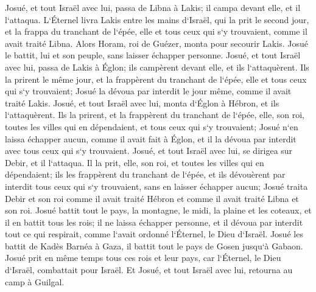 \verse Josué, et tout Israël avec lui, passa de Libna à Lakis; il campa devant elle, et il l`attaqua. 
\verse L`Éternel livra Lakis entre les mains d`Israël, qui la prit le second jour, et la frappa du tranchant de l`épée, elle et tous ceux qui s`y trouvaient, comme il avait traité Libna. 
\verse Alors Horam, roi de Guézer, monta pour secourir Lakis. Josué le battit, lui et son peuple, sans laisser échapper personne. 
\verse Josué, et tout Israël avec lui, passa de Lakis à Églon; ils campèrent devant elle, et ils l`attaquèrent. 
\verse Ils la prirent le même jour, et la frappèrent du tranchant de l`épée, elle et tous ceux qui s`y trouvaient; Josué la dévoua par interdit le jour même, comme il avait traité Lakis. 
\verse Josué, et tout Israël avec lui, monta d`Églon à Hébron, et ils l`attaquèrent. 
\verse Ils la prirent, et la frappèrent du tranchant de l`épée, elle, son roi, toutes les villes qui en dépendaient, et tous ceux qui s`y trouvaient; Josué n`en laissa échapper aucun, comme il avait fait à Églon, et il la dévoua par interdit avec tous ceux qui s`y trouvaient. 
\verse Josué, et tout Israël avec lui, se dirigea sur Debir, et il l`attaqua. 
\verse Il la prit, elle, son roi, et toutes les villes qui en dépendaient; ils les frappèrent du tranchant de l`épée, et ils dévouèrent par interdit tous ceux qui s`y trouvaient, sans en laisser échapper aucun; Josué traita Debir et son roi comme il avait traité Hébron et comme il avait traité Libna et son roi. 
\verse Josué battit tout le pays, la montagne, le midi, la plaine et les coteaux, et il en battit tous les rois; il ne laissa échapper personne, et il dévoua par interdit tout ce qui respirait, comme l`avait ordonné l`Éternel, le Dieu d`Israël. 
\verse Josué les battit de Kadès Barnéa à Gaza, il battit tout le pays de Gosen jusqu`à Gabaon. 
\verse Josué prit en même temps tous ces rois et leur pays, car l`Éternel, le Dieu d`Israël, combattait pour Israël. 
\verse Et Josué, et tout Israël avec lui, retourna au camp à Guilgal. 

